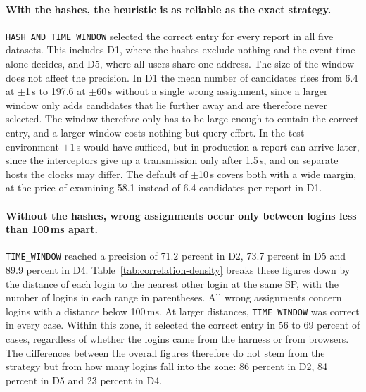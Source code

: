 \documentclass[../main.tex]{subfiles}
\begin{document}
\paragraph{With the hashes, the heuristic is as reliable as the exact strategy.}
\texttt{HASH\_\allowbreak{}AND\_\allowbreak{}TIME\_\allowbreak{}WINDOW} selected the correct entry 
for every report in all five datasets. 
This includes D1, where the hashes exclude nothing and the event time alone decides, and D5, where 
all users share one address. 
The size of the window does not affect the precision. 
In D1 the mean number of candidates rises from 6.4 at $\pm$1\,s to 197.6 at $\pm$60\,s without a 
single wrong assignment, since a larger window only adds candidates that lie further away and are 
therefore never selected. 
The window therefore only has to be large enough to contain the correct entry, and a larger window 
costs nothing but query effort. 
In the test environment $\pm$1\,s would have sufficed, but in production a report can arrive later, 
since the interceptors give up a transmission only after 1.5\,s, and on separate hosts the clocks 
may differ. 
The default of $\pm$10\,s covers both with a wide margin, at the price of examining 58.1 instead of 
6.4 candidates per report in D1. 

\paragraph{Without the hashes, wrong assignments occur only between logins less than 100\,ms apart.}
\texttt{TIME\_\allowbreak{}WINDOW} reached a precision of 71.2 percent in D2, 73.7 percent in D5 and 
89.9 percent in D4. 
Table~\ref{tab:correlation-density} breaks these figures down by the distance of each login to the 
nearest other login at the same SP, with the number of logins in each range in parentheses. 
All wrong assignments concern logins with a distance below 100\,ms. 
At larger distances, \texttt{TIME\_\allowbreak{}WINDOW} was correct in every case. 
Within this zone, it selected the correct entry in 56 to 69 percent of cases, regardless of whether 
the logins came from the harness or from browsers. 
The differences between the overall figures therefore do not stem from the strategy but from how 
many logins fall into the zone: 86 percent in D2, 84 percent in D5 and 23 percent in D4.
\end{document}

